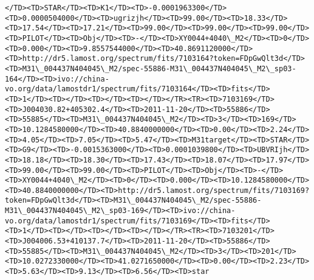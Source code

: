 \documentclass[11pt]{article}
\begin{document}
\begin{Verbatim}[commandchars=\\\{\}]
</TD><TD>STAR</TD><TD>K1</TD><TD>-0.0001963300</TD><TD>0.0000504000</TD><TD>ugrizjh</TD><TD>99.00</TD><TD>18.33</TD><TD>17.54</TD><TD>17.21</TD><TD>99.00</TD><TD>99.00</TD><TD>99.00</TD><TD>PILOT</TD><TD>Obj</TD><TD>-</TD><TD>XY0044+4040\_M2</TD><TD>0</TD><TD>0.000</TD><TD>9.8557544000</TD><TD>40.8691120000</TD><TD>http://dr5.lamost.org/spectrum/fits/7103164?token=FDpGwQlt3d</TD><TD>M31\_004437N404045\_M2/spec-55886-M31\_004437N404045\_M2\_sp03-164</TD><TD>ivo://china-vo.org/data/lamostdr1/spectrum/fits/7103164</TD><TD>fits</TD><TD>1</TD><TD></TD><TD></TD><TD></TD></TR><TR><TD>7103169</TD><TD>J004030.82+405302.4</TD><TD>2011-11-20</TD><TD>55886</TD><TD>55885</TD><TD>M31\_004437N404045\_M2</TD><TD>3</TD><TD>169</TD><TD>10.1284580000</TD><TD>40.8840000000</TD><TD>0.00</TD><TD>2.24</TD><TD>4.05</TD><TD>7.05</TD><TD>5.47</TD><TD>M31target</TD><TD>STAR</TD><TD>G9</TD><TD>-0.0015363000</TD><TD>0.0001039800</TD><TD>UBVRIjh</TD><TD>18.18</TD><TD>18.30</TD><TD>17.43</TD><TD>18.07</TD><TD>17.97</TD><TD>99.00</TD><TD>99.00</TD><TD>PILOT</TD><TD>Obj</TD><TD>-</TD><TD>XY0044+4040\_M2</TD><TD>0</TD><TD>0.000</TD><TD>10.1284580000</TD><TD>40.8840000000</TD><TD>http://dr5.lamost.org/spectrum/fits/7103169?token=FDpGwQlt3d</TD><TD>M31\_004437N404045\_M2/spec-55886-M31\_004437N404045\_M2\_sp03-169</TD><TD>ivo://china-vo.org/data/lamostdr1/spectrum/fits/7103169</TD><TD>fits</TD><TD>1</TD><TD></TD><TD></TD><TD></TD></TR><TR><TD>7103201</TD><TD>J004006.53+410137.7</TD><TD>2011-11-20</TD><TD>55886</TD><TD>55885</TD><TD>M31\_004437N404045\_M2</TD><TD>3</TD><TD>201</TD><TD>10.0272330000</TD><TD>41.0271650000</TD><TD>0.00</TD><TD>2.23</TD><TD>5.63</TD><TD>9.13</TD><TD>6.56</TD><TD>star     
\end{Verbatim}
\end{document}
